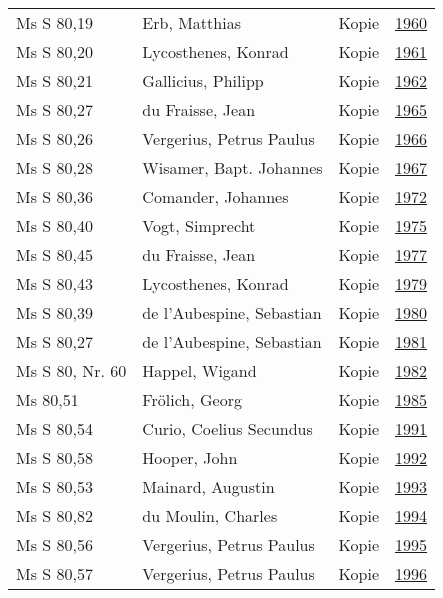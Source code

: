 \documentclass[10pt,a4paper,landscape]{report}
\begin{document}
\begin{longtable}{p{16cm}p{4cm}lr}
Ms S 80,19	&	Erb, Matthias	&	Kopie	&	\href{http://130.60.24.72/assignment/1960}{1960}\\
Ms S 80,20	&	Lycosthenes, Konrad	&	Kopie	&	\href{http://130.60.24.72/assignment/1961}{1961}\\
Ms S 80,21	&	Gallicius, Philipp	&	Kopie	&	\href{http://130.60.24.72/assignment/1962}{1962}\\
Ms S 80,27	&	du Fraisse, Jean	&	Kopie	&	\href{http://130.60.24.72/assignment/1965}{1965}\\
Ms S 80,26	&	Vergerius, Petrus Paulus	&	Kopie	&	\href{http://130.60.24.72/assignment/1966}{1966}\\
Ms S 80,28	&	Wisamer, Bapt. Johannes	&	Kopie	&	\href{http://130.60.24.72/assignment/1967}{1967}\\
Ms S 80,36	&	Comander, Johannes	&	Kopie	&	\href{http://130.60.24.72/assignment/1972}{1972}\\
Ms S 80,40	&	Vogt, Simprecht	&	Kopie	&	\href{http://130.60.24.72/assignment/1975}{1975}\\
Ms S 80,45	&	du Fraisse, Jean	&	Kopie	&	\href{http://130.60.24.72/assignment/1977}{1977}\\
Ms S 80,43	&	Lycosthenes, Konrad	&	Kopie	&	\href{http://130.60.24.72/assignment/1979}{1979}\\
Ms S 80,39	&	de l'Aubespine, Sebastian	&	Kopie	&	\href{http://130.60.24.72/assignment/1980}{1980}\\
Ms S 80,27	&	de l'Aubespine, Sebastian	&	Kopie	&	\href{http://130.60.24.72/assignment/1981}{1981}\\
Ms S 80, Nr. 60	&	Happel, Wigand	&	Kopie	&	\href{http://130.60.24.72/assignment/1982}{1982}\\
Ms 80,51	&	Frölich, Georg	&	Kopie	&	\href{http://130.60.24.72/assignment/1985}{1985}\\
Ms S 80,54	&	Curio, Coelius Secundus	&	Kopie	&	\href{http://130.60.24.72/assignment/1991}{1991}\\
Ms S 80,58	&	Hooper, John	&	Kopie	&	\href{http://130.60.24.72/assignment/1992}{1992}\\
Ms S 80,53	&	Mainard, Augustin	&	Kopie	&	\href{http://130.60.24.72/assignment/1993}{1993}\\
Ms S 80,82	&	du Moulin, Charles	&	Kopie	&	\href{http://130.60.24.72/assignment/1994}{1994}\\
Ms S 80,56	&	Vergerius, Petrus Paulus	&	Kopie	&	\href{http://130.60.24.72/assignment/1995}{1995}\\
Ms S 80,57	&	Vergerius, Petrus Paulus	&	Kopie	&	\href{http://130.60.24.72/assignment/1996}{1996}\\

\end{longtable}
\end{document}
